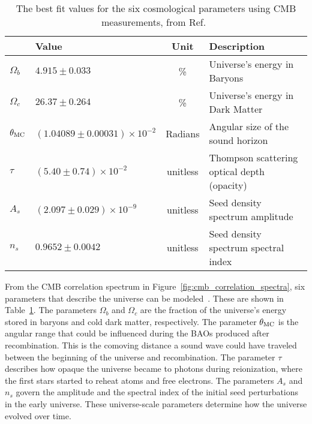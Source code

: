 \begin{table}[t]
  \centering
  \begin{tabular}{llcl}
               & \textbf{Value}                 & \textbf{Unit} & \textbf{Description} \\
    \hline 
    $\Omega_b$ & $ 4.915  \pm0.033                 $ & \%       & Universe's energy in Baryons \\
    $\Omega_c$ & $ 26.37  \pm0.264                 $ & \%       & Universe's energy in Dark Matter \\
    $\theta_{\textrm{MC}}$ & $(1.04089\pm0.00031)\times 10^{-2}$ & Radians  & Angular size of the sound horizon \\
    $\tau$     & $(5.40   \pm0.74   )\times 10^{-2}$ & unitless & Thompson scattering optical depth (opacity)\\
    $A_s$      & $(2.097  \pm0.029  )\times 10^{-9}$ & unitless & Seed density spectrum amplitude \\
    $n_s$      & $ 0.9652 \pm0.0042                $ & unitless & Seed density spectrum spectral index \\
    \hline 
  \end{tabular}
  \caption[6 Cosmological Parameters]{
    The best fit values for the six cosmological parameters using CMB measurements, from Ref.~\cite{planck_dm_limit}}
  \label{tab:six_params}
\end{table}

From the CMB correlation spectrum in Figure~\ref{fig:cmb_correlation_spectra}, six parameters that describe the universe can be modeled~\cite{planck_dm_limit,planck_2013_parameters}.
These are shown in Table~\ref{tab:six_params}.
The parameters $\Omega_b$ and $\Omega_c$ are the fraction of the universe's energy stored in baryons and cold dark matter, respectively.
The parameter $\theta_{\textrm{MC}}$ is the angular range that could be influenced during the BAOs produced after recombination.
This is the comoving distance a sound wave could have traveled between the beginning of the universe and recombination.
The parameter $\tau$ describes how opaque the universe became to photons during reionization, where the first stars started to reheat atoms and free electrons.
The parameters $A_s$ and $n_s$ govern the amplitude and the spectral index of the initial seed perturbations in the early universe.
These universe-scale parameters determine how the universe evolved over time.

